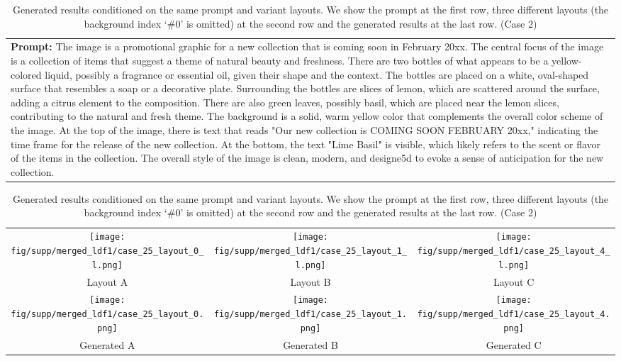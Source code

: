 \begin{table}[htbp]
    \centering
    \begin{tabular}{p{\textwidth}}
    \midrule
    \textbf{Prompt:} \small{The image is a promotional graphic for a new collection that is coming soon in February 20xx. The central focus of the image is a collection of items that suggest a theme of natural beauty and freshness. There are two bottles of what appears to be a yellow-colored liquid, possibly a fragrance or essential oil, given their shape and the context. The bottles are placed on a white, oval-shaped surface that resembles a soap or a decorative plate. Surrounding the bottles are slices of lemon, which are scattered around the surface, adding a citrus element to the composition. There are also green leaves, possibly basil, which are placed near the lemon slices, contributing to the natural and fresh theme. The background is a solid, warm yellow color that complements the overall color scheme of the image. At the top of the image, there is text that reads "Our new collection is COMING SOON FEBRUARY 20xx," indicating the time frame for the release of the new collection. At the bottom, the text "Lime Basil" is visible, which likely refers to the scent or flavor of the items in the collection. The overall style of the image is clean, modern, and designe5d to evoke a sense of anticipation for the new collection.}
    \vspace{1em}
    \end{tabular}
    \begin{tabular}{ccc}
        \texttt{[image: fig/supp/merged\_ldf1/case\_25\_layout\_0\_l.png]} &
        \texttt{[image: fig/supp/merged\_ldf1/case\_25\_layout\_1\_l.png]} &
        \texttt{[image: fig/supp/merged\_ldf1/case\_25\_layout\_4\_l.png]} \\
        \small{Layout A} & \small{Layout B} & \small{Layout C} \\[1em]
        \texttt{[image: fig/supp/merged\_ldf1/case\_25\_layout\_0.png]} &
        \texttt{[image: fig/supp/merged\_ldf1/case\_25\_layout\_1.png]} &
        \texttt{[image: fig/supp/merged\_ldf1/case\_25\_layout\_4.png]} \\
        \small{Generated A} & \small{Generated B} & \small{Generated C} \\
        \bottomrule
    \end{tabular}
    
    \caption{Generated results conditioned on the same prompt and variant layouts. We show the prompt at the first row, three different layouts (the background index `\#0' is omitted) at the second row and the generated results at the last row. (Case 2)}
    \label{tab:variant_layout2}
\end{table}

